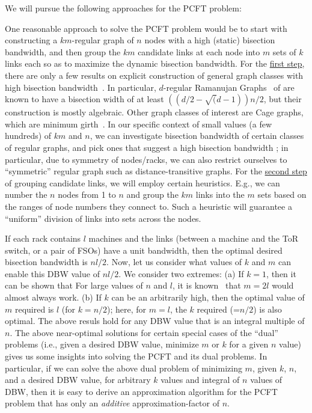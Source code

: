  We will pursue the following approaches
for the PCFT problem:

 One reasonable approach to
solve the PCFT problem would be to start with constructing a
$km$-regular graph of $n$ nodes with a high (static) bisection
bandwidth, and then group the $km$ candidate links at each node into
$m$ sets of $k$ links each so as to maximize the dynamic bisection
bandwidth. For the \underline{first step}, there are only a few
results on explicit construction of general graph classes with high
bisection bandwidth~\cite{peres}. In particular, $d$-regular Ramanujan
Graphs~\cite{rewire-18} of are known to have a bisection width of at
least $((d/2 - \sqrt(d-1))n/2$, but their construction is mostly
algebraic. Other graph classes of interest are Cage graphs, which are
minimum girth~\cite{cage}. In our specific context of small values (a
few hundreds) of $km$ and $n$, we can investigate bisection bandwidth
of certain classes of regular graphs, and pick ones that suggest a
high bisection bandwidth ; in particular, due
to symmetry of nodes/racks, we can also restrict ourselves to
``symmetric'' regular graph such as distance-transitive graphs. For
the \underline{second step} of grouping candidate links, we will
employ certain heuristics. E.g., we can number the $n$ nodes from 1 to
$n$ and group the $km$ links into the $m$ sets based on the ranges of
node numbers they connect to. Such a heuristic will guarantee a
``uniform'' division of links into sets across the nodes.

  If each rack contains $l$ machines
and the links (between a machine and the ToR switch, or a pair of
FSOs) have a unit bandwidth, then the optimal desired bisection
bandwidth is $nl/2$. 
%
Now, let us consider what values of $k$ and $m$ can enable this DBW
value of $nl/2$. We consider two extremes: (a) If $k=1$, then it can
be shown that  For large values of $n$ and $l$, it is
known~\cite{book-28-29} that $m=2l$ would almost always work. (b) If
$k$ can be an arbitrarily high, then the optimal value of $m$ required
is $l$ (for $k=n/2$); here, for $m=l$, the $k$ required (=$n/2$) is
also optimal. The above resuls hold for any DBW value that is an
integral multiple of $n$.
%
The above near-optimal solutions for certain special cases of the
``dual'' problems (i.e., given a desired DBW value, minimize $m$ or
$k$ for a given $n$ value) gives us some insights into solving the
PCFT and its dual problems.  In particular, if we can solve the above
dual problem of minimizing $m$, given $k$, $n$, and a desired DBW
value, for arbitrary $k$ values and integral of $n$ values of DBW,
then it is easy to derive an approximation algorithm for the PCFT
problem that has only an {\em additive} approximation-factor of $n$.

